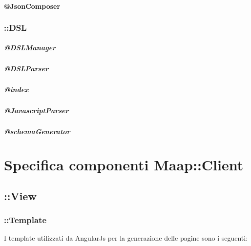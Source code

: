 \paragraph{@JsonComposer}

\subsubsection{::DSL}
\subparagraph{@DSLManager}
\subparagraph{@DSLParser}
\subparagraph{@index}
\subparagraph{@JavascriptParser}
\subparagraph{@schemaGenerator}

\section{Specifica componenti Maap::Client}

\subsection{::View}

\subsubsection{::Template}
I template utilizzati da AngularJs per la generazione delle pagine sono i seguenti:

